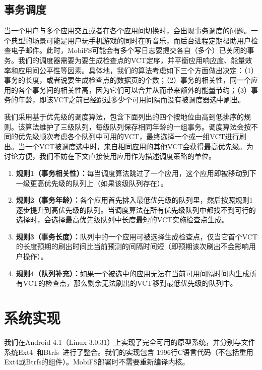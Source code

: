 \subsection{事务调度}
\label{vct:sched}

当一个用户与多个应用交互或者在各个应用间切换时，会出现事务调度的问题。一个典型的场景可能是用户玩手机游戏的同时在听音乐，而后台进程定期帮助用户检查电子邮件。此时，MobiFS可能会有多个写日志要提交各自（多个）已关闭的事务。我们的调度器需要为要生成检查点的VCT定序，并平衡应用响应度、能量效率和应用间公平性等因素。具体地，我们的算法考虑如下三个方面做出决定：（1）事务的长度，或者说要生成检查点的数据页的个数；（2）事务的相关性，同一个应用的各个事务间的相关性高，因为它们可以合并从而带来额外的能量节约；（3）事务的年龄，即该VCT之前已经跳过多少个可用间隔而没有被调度器选中刷出。 
 
我们采用基于优先级的调度算法，包含下面列出的四个按地位由高到低排序的规则。该算法维护了三级队列，每级队列保存相同年龄的一组事务。调度算法会按不同的优先级顺次考虑各个队列中可用的VCT，最终选择一个或一组VCT进行刷出。当一个VCT被调度选中时，来自相同应用的其他VCT会获得最高优先级。为讨论方便，我们不妨在下文直接使用应用作为描述调度策略的单位。

\begin{enumerate}
\item \textbf{规则1（事务相关性）：}每当调度算法跳过了一个应用，这个应用即被移动到下一级更高优先级的队列上（如果该级队列存在）。

\item \textbf{规则2（事务年龄）：}各个应用首先排入最低优先级的队列里，然后按照规则1逐步提升到高优先级的队列。当调度算法在所有优先级队列中都找不到可行的选择时，会选择最高优先级队列中长度最短的VCT实施检查点生成。

\item \textbf{规则3（事务长度）：}队列中的一个应用可被选择生成检查点，仅当它首个VCT的长度预期的刷出时间比当前预测的间隔时间短（即预期该次刷出不会影响用户操作）。

\item \textbf{规则4（队列补充）：}如果一个被选中的应用无法在当前可用间隔时间内生成所有VCT的检查点，那么剩余无法刷出的VCT移到最低优先级的队列中。

\end{enumerate}

\section{系统实现}

我们在Android 4.1（Linux 3.0.31）上实现了完全可用的原型系统，并分别与文件系统Ext4~\cite{Mathur:Ext4:2007}和Btrfs~\cite{Rodeh:2013:BLB:2501620.2501623}进行了整合。我们的实现包含
1996行C语言代码（不包括重用Ext4或Btrfs的组件）。MobiFS部署时不需要重新编译内核。

